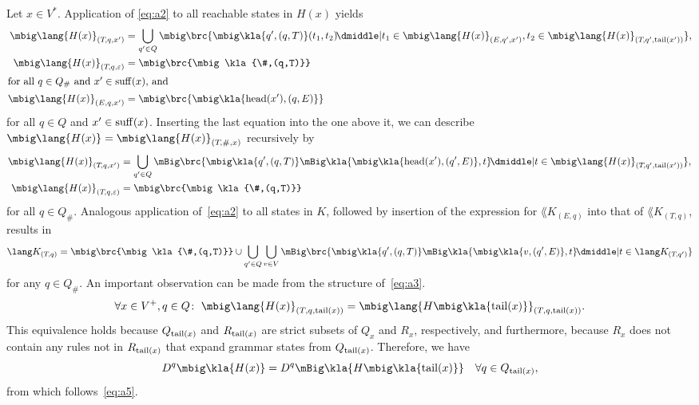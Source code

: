Let $x\in V^*$. Application of \eqref{eq:a2} to all reachable states in $H(x)$ yields
\begin{align*}
 \mbig\lang{H(x)}_{(T\!,q,x')} &= \bigcup_{q'\in Q}\mbig\brc{\mbig\kla{q',(q,T)}(t_1,t_2) \!\pipe t_1\in\mbig\lang{H(x)}_{(E,q',x')}, t_2\in\mbig\lang{H(x)}_{(T\!,q',\cdr(x'))}}, \\
 \mbig\lang{H(x)}_{(T\!,q,\eps)} &= \mbig\brc{\mbig\kla{\#,(q,T)}} \\
 \intertext{for all $q\in Q_\#$ and $x'\in\suff(x)$, and}
 \mbig\lang{H(x)}_{(E,q,x')} &= \mbig\brc{\mbig\kla{\car(x'),(q,E)}}
\end{align*}
for all $q\in Q$ and $x'\in\operatorname{suff}(x)$. Inserting the last equation into the one above it, we can describe $\mbig\lang{H(x)} = \mbig\lang{H(x)}_{(T\!,\#,x)}$ recursively by
\begin{subequations}\label{eq:a3}\begin{align}
 \mbig\lang{H(x)}_{(T\!,q,x')} &= \bigcup_{q'\in Q}\mBig\brc{\mbig\kla{q',(q,T)}\mBig\kla{\mbig\kla{\car(x'),(q',E)},t} \!\pipe t\in\mbig\lang{H(x)}_{(T\!,q',\cdr(x'))}}, \label{eq:a3a} \\
 \mbig\lang{H(x)}_{(T\!,q,\eps)} &= \mbig\brc{\mbig\kla{\#,(q,T)}} \label{eq:a3b}
\end{align}\end{subequations}
for all $q\in Q_\#$. Analogous application of~\eqref{eq:a2} to all states in
$K$, followed by insertion of the expression for $\lang K_{(E,q)}$ into that of
$\lang K_{(T\!,q)}$, results in
\begin{equation}\label{eq:a4}
 \lang K_{(T\!,q)} = \mbig\brc{\mbig\kla{\#,(q,T)}} \cup \bigcup_{q'\in Q}\bigcup_{v\in V}\mBig\brc{\mbig\kla{q',(q,T)}\mBig\kla{\mbig\kla{v,(q',E)},t} \!\pipe t\in\lang K_{(T\!,q')}}
\end{equation}
for any $q\in Q_\#$. An important observation can be made from the structure of~\eqref{eq:a3}.
\begin{equation}\label{eq:a5}
 \forall x\in V^+, q\in Q\colon\;
 \mbig\lang{H(x)}_{(T,q,\cdr(x))} = \mbig\lang{H\mbig\kla{\cdr(x)}}_{(T,q,\cdr(x))}.
\end{equation}
This equivalence holds because $Q_{\operatorname{tail}(x)}$ and $R_{\operatorname{tail}(x)}$ are strict
subsets of $Q_x$ and $R_x$, respectively, and furthermore, because $R_x$ does
not contain any rules not in $R_{\operatorname{tail}(x)}$ that expand grammar states from
$Q_{\operatorname{tail}(x)}$. Therefore, we have
\[
 D^q\mbig\kla{H(x)} = D^q\mBig\kla{H\mbig\kla{\cdr(x)}} \quad\forall q\in Q_{\cdr(x)},
\]
from which follows~\eqref{eq:a5}.


